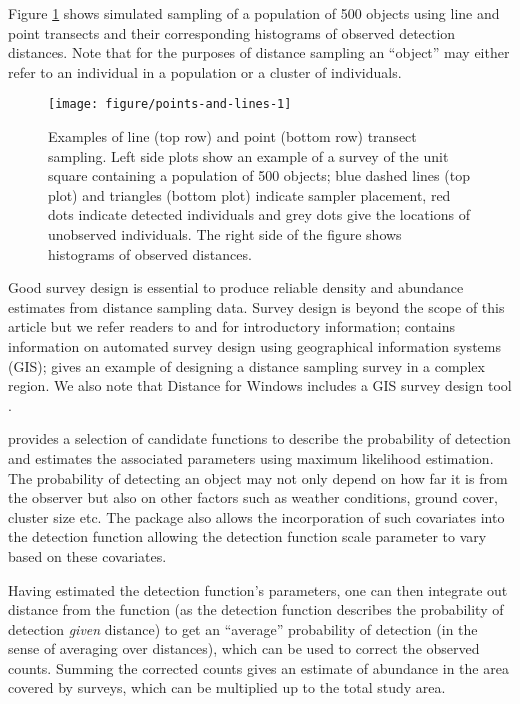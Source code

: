 \documentclass[article]{jss}\usepackage[]{graphicx}\usepackage[]{color}
\makeatletter
\def\maxwidth{ %
  \ifdim\Gin@nat@width>\linewidth
    \linewidth
  \else
    \Gin@nat@width
  \fi
}
\makeatother
\begin{document}
Figure \ref{fig:pointslines} shows simulated sampling of a population of 500 objects using line and point transects and their corresponding histograms of observed detection distances. Note that for the purposes of distance sampling an ``object'' may either refer to an individual in a population or a cluster of individuals.  

\begin{figure}
\begin{center}
\begin{Schunk}

\texttt{[image: figure/points-and-lines-1]} \end{Schunk}
\caption{Examples of line (top row) and point (bottom row) transect sampling. Left side plots show an example of a survey of the unit square containing a population of 500 objects; blue dashed lines (top plot) and triangles (bottom plot) indicate sampler placement, red dots indicate detected individuals and grey dots give the locations of unobserved individuals. The right side of the figure shows histograms of observed distances.}
\label{fig:pointslines}
\end{center}
\end{figure}


Good survey design is essential to produce reliable density and abundance estimates from distance sampling data. Survey design is beyond the scope of this article but we refer readers to \cite[][Chapter 7]{Buckland:2001vm} and \cite[][Chapter 2]{buckland2015distance} for introductory information; \cite{Strindberg:2004vr} contains information on automated survey design using geographical information systems (GIS); \cite{Thomas:2007wz} gives an example of designing a distance sampling survey in a complex region. We also note that Distance for Windows includes a GIS survey design tool \citep{Thomas:2010cf}.

 provides a selection of candidate functions to describe the probability of detection and estimates the associated parameters using maximum likelihood estimation. The probability of detecting an object may not only depend on how far it is from the observer but also on other factors such as weather conditions, ground cover, cluster size etc. The  package also allows the incorporation of such covariates into the detection function allowing the detection function scale parameter to vary based on these covariates.

Having estimated the detection function's parameters, one can then integrate out distance from the function (as the detection function describes the probability of detection \textit{given} distance) to get an ``average'' probability of detection (in the sense of averaging over distances), which can be used to correct the observed counts. Summing the corrected counts gives an estimate of abundance in the area covered by surveys, which can be multiplied up to the total study area.
\end{document}
